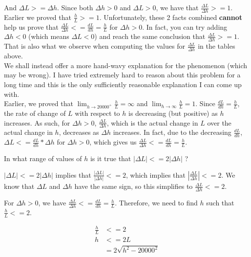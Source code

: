 \documentclass[9pt]{article}
\begin{document}
And $\Delta L >= \Delta h$. Since both $\Delta h > 0$ and $\Delta L > 0$, we have that $\frac{\Delta L}{\Delta h} >= 1$.  Earlier we proved that $\frac{h}{L} >= 1$. Unfortunately, these 2 facts combined \textbf{cannot} help us prove that $\frac{\Delta L}{\Delta h} <= \frac{dL}{dh} = \frac{h}{L}$ for $\Delta h > 0$. In fact, you can try adding $\Delta h < 0$ (which means $\Delta L < 0$) and reach the same conclusion that $\frac{\Delta L}{\Delta h} >= 1$. That is also what we observe when computing the values for $\frac{\Delta L}{\Delta h}$ in the tables above. \\

We shall instead offer a more hand-wavy explanation for the phenomenon (which may be wrong). I have tried extremely hard to reason about this problem for a long time and this is the only sufficiently reasonable explanation I can come up with.\\

Earlier, we proved that $\lim_{h \rightarrow 20000^+} \frac{h}{L} = \infty$ and $\lim_{h \rightarrow \infty} \frac{h}{L} = 1$. Since $\frac{dL}{dh} = \frac{h}{L}$, the rate of change of $L$ with respect to $h$ is decreasing (but positive) as $h$ increases. As such, for $\Delta h > 0$, $\frac{\Delta L}{\Delta h}$, which is the actual change in $L$ over the actual change in $h$, decreases as $\Delta h$ increases. In fact, due to the decreasing $\frac{dL}{dh}$, $\Delta L <= \frac{dL}{dh} * \Delta h$ for $\Delta h > 0$, which gives us $\frac{\Delta L}{\Delta h} <= \frac{dL}{dh} = \frac{h}{L}$.

\begin{tcolorbox}
  In what range of values of $h$ is it true that $|\Delta L| <= 2|\Delta h|$ ?
\end{tcolorbox}

$|\Delta L| <= 2|\Delta h|$ implies that $\frac{|\Delta L|}{|\Delta h|} <= 2$, which implies that $|\frac{\Delta L}{\Delta h}| <= 2$. We know that $\Delta L$ and $\Delta h$ have the same sign, so this simplifies to $\frac{\Delta L}{\Delta h} <= 2$.

For $\Delta h > 0$, we have $\frac{\Delta L}{\Delta h} <= \frac{dL}{dh} = \frac{h}{L}$. Therefore, we need to find $h$ such that $\frac{h}{L} <= 2$.

\begin{align*}
  \frac{h}{L} &<= 2 \\
  h &<= 2L \\
    &= 2\sqrt{h^2 - 20000^2}
\end{align*}
\end{document}
